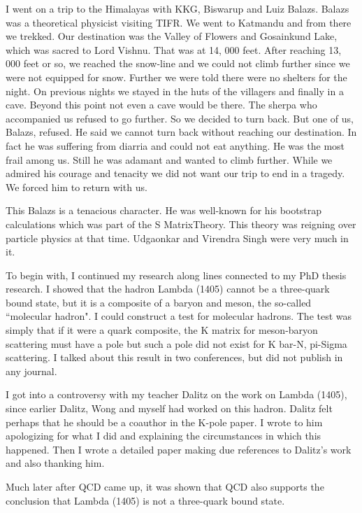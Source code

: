 I went on a trip to the Himalayas with KKG, Biswarup and Luiz Balazs. 
Balazs was a theoretical physicist visiting TIFR. We went to Katmandu 
and from there we trekked. Our destination was the Valley of Flowers and 
Gosainkund Lake, which was sacred to Lord Vishnu. That was at 14, 000 
feet. After reaching 13, 000 feet or so, we reached the snow-line and we 
could not climb further since we were not equipped for snow. Further we 
were told there were no shelters for the night. On previous nights we 
stayed in the huts of the villagers and finally in a cave. Beyond this 
point not even a cave would be there. The sherpa who accompanied us 
refused to go further. So we decided to turn back. But one of us, 
Balazs, refused. He said we cannot turn back without reaching our 
destination. In fact he was suffering from diarria and could not eat 
anything. He was the most frail among us. Still he was adamant and 
wanted to climb further. While we admired his courage and tenacity we 
did not want our trip to end in a tragedy. We forced him to return with 
us.

This Balazs is a tenacious character. He was well-known for his 
bootstrap calculations which was part of the S Matrix\break Theory. This 
theory was reigning over particle physics at that time. Udgaonkar and 
Virendra Singh were very much in it.

To begin with, I continued my research along lines connected to my PhD 
thesis research. I showed that the hadron Lambda (1405) cannot be a 
three-quark bound state, but it is a composite of a baryon and meson, 
the so-called ``molecular hadron". I could construct a test for molecular 
hadrons. The test was simply that if it were a quark composite, the K 
matrix for meson-baryon scatte\-ring must have a pole but such a pole did 
not exist for K bar-N, pi-Sigma scattering. I talked about this result 
in two conferences, but did not publish in any journal.

I got into a controversy with my teacher Dalitz on the work on Lambda 
(1405), since earlier Dalitz, Wong and myself had worked on this hadron. 
Dalitz felt perhaps that he should be a coauthor in the K-pole paper. I 
wrote to him apologizing for what I did and explaining the circumstances 
in which this happened. Then I wrote a detailed paper making due 
references to Dalitz's work and also thanking him.

Much later after QCD came up, it was shown that QCD also supports the 
conclusion that Lambda (1405) is not a three-quark bound state.

